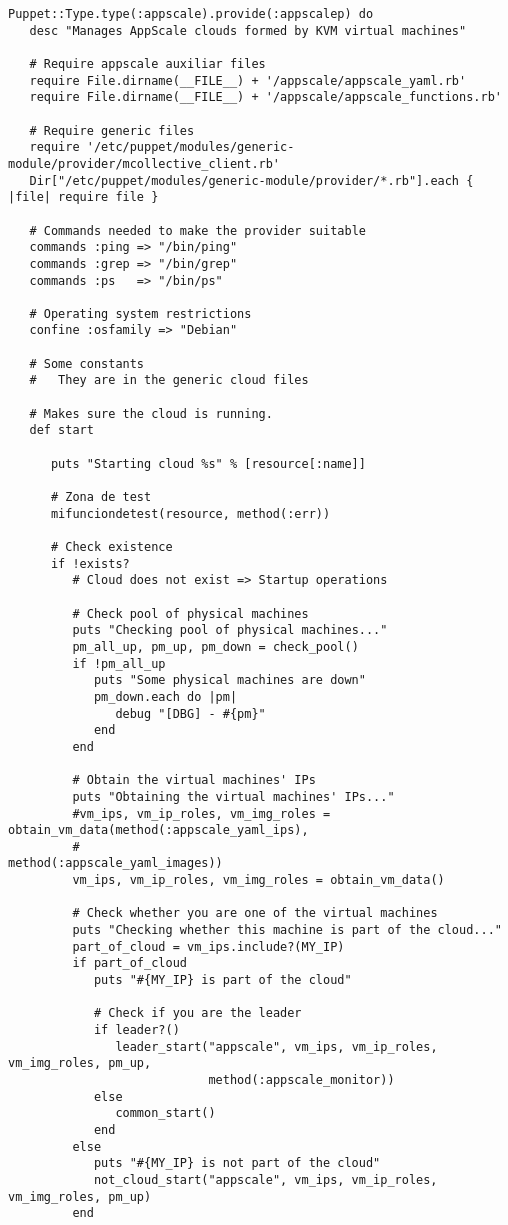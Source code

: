 \begin{lstlisting}
Puppet::Type.type(:appscale).provide(:appscalep) do
   desc "Manages AppScale clouds formed by KVM virtual machines"

   # Require appscale auxiliar files
   require File.dirname(__FILE__) + '/appscale/appscale_yaml.rb'
   require File.dirname(__FILE__) + '/appscale/appscale_functions.rb'
   
   # Require generic files
   require '/etc/puppet/modules/generic-module/provider/mcollective_client.rb'
   Dir["/etc/puppet/modules/generic-module/provider/*.rb"].each { |file| require file }
   
   # Commands needed to make the provider suitable
   commands :ping => "/bin/ping"
   commands :grep => "/bin/grep"
   commands :ps   => "/bin/ps"
   
   # Operating system restrictions
   confine :osfamily => "Debian"

   # Some constants
   #   They are in the generic cloud files

   # Makes sure the cloud is running.
   def start

      puts "Starting cloud %s" % [resource[:name]]
      
      # Zona de test
      mifunciondetest(resource, method(:err))
      
      # Check existence
      if !exists?
         # Cloud does not exist => Startup operations
         
         # Check pool of physical machines
         puts "Checking pool of physical machines..."
         pm_all_up, pm_up, pm_down = check_pool()
         if !pm_all_up
            puts "Some physical machines are down"
            pm_down.each do |pm|
               debug "[DBG] - #{pm}"
            end
         end
         
         # Obtain the virtual machines' IPs
         puts "Obtaining the virtual machines' IPs..."
         #vm_ips, vm_ip_roles, vm_img_roles = obtain_vm_data(method(:appscale_yaml_ips),
         #                                                   method(:appscale_yaml_images))
         vm_ips, vm_ip_roles, vm_img_roles = obtain_vm_data()
         
         # Check whether you are one of the virtual machines
         puts "Checking whether this machine is part of the cloud..."
         part_of_cloud = vm_ips.include?(MY_IP)
         if part_of_cloud
            puts "#{MY_IP} is part of the cloud"
            
            # Check if you are the leader
            if leader?()
               leader_start("appscale", vm_ips, vm_ip_roles, vm_img_roles, pm_up,
                            method(:appscale_monitor))
            else
               common_start()
            end
         else
            puts "#{MY_IP} is not part of the cloud"
            not_cloud_start("appscale", vm_ips, vm_ip_roles, vm_img_roles, pm_up)
         end
         

\end{lstlisting}
